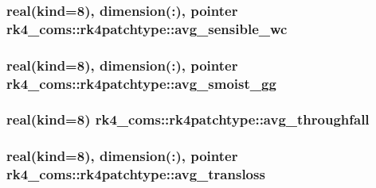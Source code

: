 \subsubsection[{avg\+\_\+sensible\+\_\+wc}]{\setlength{\rightskip}{0pt plus 5cm}real(kind=8), dimension(\+:), pointer rk4\+\_\+coms\+::rk4patchtype\+::avg\+\_\+sensible\+\_\+wc}\label{structrk4__coms_1_1rk4patchtype_a7b82112214dee9a3c72043a024acb538}
\hypertarget{structrk4__coms_1_1rk4patchtype_ab560e2cc8ea1d10fdd457fa4a642b84c}{}
\subsubsection[{avg\+\_\+smoist\+\_\+gg}]{\setlength{\rightskip}{0pt plus 5cm}real(kind=8), dimension(\+:), pointer rk4\+\_\+coms\+::rk4patchtype\+::avg\+\_\+smoist\+\_\+gg}\label{structrk4__coms_1_1rk4patchtype_ab560e2cc8ea1d10fdd457fa4a642b84c}
\hypertarget{structrk4__coms_1_1rk4patchtype_a0ec74d80afb3b2cd79ab7f574e63b9e2}{}
\subsubsection[{avg\+\_\+throughfall}]{\setlength{\rightskip}{0pt plus 5cm}real(kind=8) rk4\+\_\+coms\+::rk4patchtype\+::avg\+\_\+throughfall}\label{structrk4__coms_1_1rk4patchtype_a0ec74d80afb3b2cd79ab7f574e63b9e2}
\hypertarget{structrk4__coms_1_1rk4patchtype_ac216083a0908705ed4765481944cd5fb}{}
\subsubsection[{avg\+\_\+transloss}]{\setlength{\rightskip}{0pt plus 5cm}real(kind=8), dimension(\+:), pointer rk4\+\_\+coms\+::rk4patchtype\+::avg\+\_\+transloss}\label{structrk4__coms_1_1rk4patchtype_ac216083a0908705ed4765481944cd5fb}
\hypertarget{structrk4__coms_1_1rk4patchtype_ae85ad3980980cada7d4fb144a74f110a}{}
